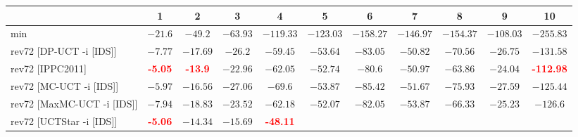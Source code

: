 \documentclass{article}
\begin{document}
\begin{tabular}{|l|r@{$\pm$}rr@{$\pm$}rr@{$\pm$}rr@{$\pm$}rr@{$\pm$}rr@{$\pm$}rr@{$\pm$}rr@{$\pm$}rr@{$\pm$}rr@{$\pm$}r|}
\hline

& \multicolumn{2}{c}{1}
& \multicolumn{2}{c}{2}
& \multicolumn{2}{c}{3}
& \multicolumn{2}{c}{4}
& \multicolumn{2}{c}{5}
& \multicolumn{2}{c}{6}
& \multicolumn{2}{c}{7}
& \multicolumn{2}{c}{8}
& \multicolumn{2}{c}{9}
& \multicolumn{2}{c|}{10}
\\
\hline
\hline
min
& \multicolumn{2}{c}{$-21.6$}
& \multicolumn{2}{c}{$-49.2$}
& \multicolumn{2}{c}{$-63.93$}
& \multicolumn{2}{c}{$-119.33$}
& \multicolumn{2}{c}{$-123.03$}
& \multicolumn{2}{c}{$-158.27$}
& \multicolumn{2}{c}{$-146.97$}
& \multicolumn{2}{c}{$-154.37$}
& \multicolumn{2}{c}{$-108.03$}
& \multicolumn{2}{c|}{$-255.83$}
\\
rev72 [DP-UCT -i [IDS]]
& \multicolumn{2}{c}{$-7.77$}
& \multicolumn{2}{c}{$-17.69$}
& \multicolumn{2}{c}{$-26.2$}
& \multicolumn{2}{c}{$-59.45$}
& \multicolumn{2}{c}{$-53.64$}
& \multicolumn{2}{c}{$-83.05$}
& \multicolumn{2}{c}{$-50.82$}
& \multicolumn{2}{c}{$-70.56$}
& \multicolumn{2}{c}{$-26.75$}
& \multicolumn{2}{c|}{$-131.58$}
\\
rev72 [IPPC2011]
& \multicolumn{2}{c}{\textbf{\textcolor{red}{-5.05}}}
& \multicolumn{2}{c}{\textbf{\textcolor{red}{-13.9}}}
& \multicolumn{2}{c}{$-22.96$}
& \multicolumn{2}{c}{$-62.05$}
& \multicolumn{2}{c}{$-52.74$}
& \multicolumn{2}{c}{$-80.6$}
& \multicolumn{2}{c}{$-50.97$}
& \multicolumn{2}{c}{$-63.86$}
& \multicolumn{2}{c}{$-24.04$}
& \multicolumn{2}{c|}{\textbf{\textcolor{red}{-112.98}}}
\\
rev72 [MC-UCT -i [IDS]]
& \multicolumn{2}{c}{$-5.97$}
& \multicolumn{2}{c}{$-16.56$}
& \multicolumn{2}{c}{$-27.06$}
& \multicolumn{2}{c}{$-69.6$}
& \multicolumn{2}{c}{$-53.87$}
& \multicolumn{2}{c}{$-85.42$}
& \multicolumn{2}{c}{$-51.67$}
& \multicolumn{2}{c}{$-75.93$}
& \multicolumn{2}{c}{$-27.59$}
& \multicolumn{2}{c|}{$-125.44$}
\\
rev72 [MaxMC-UCT -i [IDS]]
& \multicolumn{2}{c}{$-7.94$}
& \multicolumn{2}{c}{$-18.83$}
& \multicolumn{2}{c}{$-23.52$}
& \multicolumn{2}{c}{$-62.18$}
& \multicolumn{2}{c}{$-52.07$}
& \multicolumn{2}{c}{$-82.05$}
& \multicolumn{2}{c}{$-53.87$}
& \multicolumn{2}{c}{$-66.33$}
& \multicolumn{2}{c}{$-25.23$}
& \multicolumn{2}{c|}{$-126.6$}
\\
rev72 [UCTStar -i [IDS]]
& \multicolumn{2}{c}{\textbf{\textcolor{red}{-5.06}}}
& \multicolumn{2}{c}{$-14.34$}
& \multicolumn{2}{c}{$-15.69$}
& \multicolumn{2}{c}{\textbf{\textcolor{red}{-48.11}}}

\end{tabular}
\end{document}
